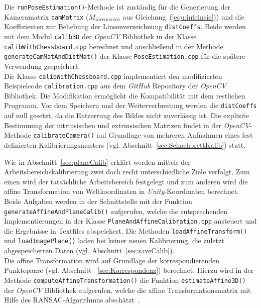 Die \texttt{run\-Pose\-Estimation()}-Methode ist zuständig für die Generierung der Kameramatrix \texttt{camMatrix}  ($M_{intrinsisch}$ aus Gleichung~(\ref{equ:intrinsic}))  und die Koeffizienten zur Behebung der Linsenverzeichnung \texttt{distCoeffs}. Beide werden mit dem Modul \texttt{calib3D} der \textit{OpenCV} Bibliothek in der Klasse \texttt{calib\-With\-Chess\-board.cpp} berechnet und anschließend in der Methode \texttt{generate\-Cam\-Mat\-And\-Dist\-Mat()} der Klasse \texttt{Pose\-Esti\-mation.cpp} für die spätere  Verwendung gespeichert.\\
Die Klasse \texttt{calib\-With\-Chess\-board.cpp} implementiert den modifizierten Beispielcode \texttt{calibration.cpp} \cite{website:calibexample} aus dem \textit{GitHub} Repository der \textit{OpenCV} Bibliothek. Die Modifikation ermöglicht die Kompatibilität mit dem restlichen Programm. Vor dem Speichern und der Weiterverbreitung werden die \texttt{distCoeffs} auf null gesetzt, da die Entzerrung des Bildes nicht zuverlässig ist. Die explizite Bestimmung der intrinsischen und extrinsischen Matrizen findet in der \textit{OpenCV}-Methode \texttt{calibrate\-Camera()} auf Grundlage von mehreren Aufnahmen eines fest definierten Kalibrierungsmusters (vgl. Abschnitt~\ref{sec:SchachbrettKalib}) statt.

Wie in Abschnitt~\ref{sec:planeCalib} erklärt werden mittels der Arbeitsbereichskalibrierung zwei doch recht unterschiedliche Ziele verfolgt. Zum einen wird der tatsächliche Arbeitsbereich festgelegt und zum anderen wird die affine Transformation von Weltkoordinaten in \emph{Unity}-Koordinaten berechnet. Beide Aufgaben werden in der Schnittstelle mit der Funktion \texttt{generate\-Affine\-And\-Plane\-Calib()} aufgerufen, welche die entsprechenden Implementierungen in der Klasse \texttt{Plane\-And\-Affine\-Calibration.cpp} ansteuert und die Ergebnisse in Textfiles abspeichert. Die Methoden \texttt{load\-Affine\-Transform()} und \texttt{load\-Image\-Plane()} laden bei keiner neuen Kalibrierung, die zuletzt abgespeicherten Daten (vgl. Abschnitt~\ref{sec:saveCalib}). \\

Die affine Transformation wird auf Grundlage der korrespondierenden Punktepaare (vgl. Abschnitt ~\ref{sec:Korrespondenz}) berechnet. Hierzu wird in der Methode \texttt{compute\-Affine\-Trans\-formation()} die Funktion \texttt{estimate\-Affine\-3D()} der \textit{OpenCV} Bibliothek aufgerufen, welche die affine Transformationsmatrix mit Hilfe des RANSAC-Algorithmus abschätzt~\cite{articel:RANSAC}.

